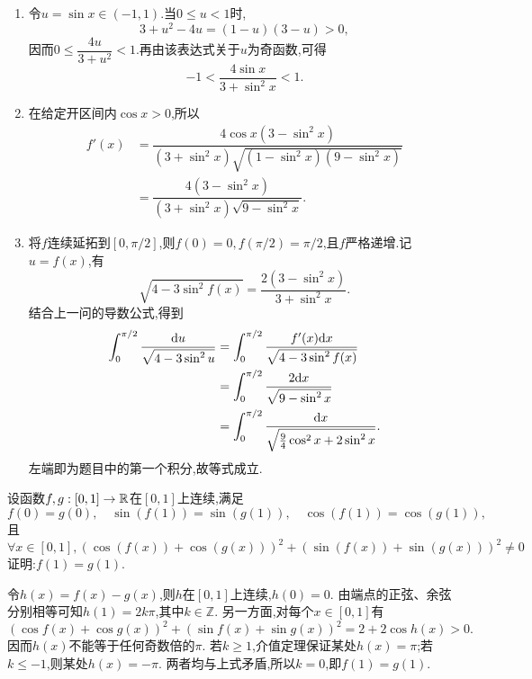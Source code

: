 \documentclass{ctexart}
\begin{document}
\begin{solution}
\begin{enumerate}[label=\textbf{(\arabic*)}]
        \item 令$u=\sin x\in(-1,1)$.当$0\leqslant u<1$时,
            \[3+u^2-4u=(1-u)(3-u)>0,\]
            因而$0\leqslant\dfrac{4u}{3+u^2}<1$.再由该表达式关于$u$为奇函数,可得
            \[-1<\dfrac{4\sin x}{3+\sin^2x}<1.\]
        \item 在给定开区间内$\cos x>0$,所以
            \[\begin{aligned}
            f'(x)&=\dfrac{4\cos x(3-\sin^2x)}{(3+\sin^2x)\sqrt{(1-\sin^2x)(9-\sin^2x)}}\\
            &=\dfrac{4(3-\sin^2x)}{(3+\sin^2x)\sqrt{9-\sin^2x}}.
            \end{aligned}\]
        \item 将$f$连续延拓到$[0,\pi/2]$,则$f(0)=0,f(\pi/2)=\pi/2$,且$f$严格递增.记$u=f(x)$,有
            \[\sqrt{4-3\sin^2f(x)}=\dfrac{2(3-\sin^2x)}{3+\sin^2x}.\]
            结合上一问的导数公式,得到
            \[\begin{aligned}
              \int_0^{\pi/2}\dfrac{\mathrm{d} u}{\sqrt{4-3\sin^2u}}
              &=\int_0^{\pi/2}\dfrac{f'(x)\mathrm{d} x}{\sqrt{4-3\sin^2f(x)}}\\
              &=\int_0^{\pi/2}\dfrac{2\mathrm{d} x}{\sqrt{9-\sin^2x}}\\
              &=\int_0^{\pi/2}\dfrac{\mathrm{d} x}{\sqrt{\frac94\cos^2x+2\sin^2x}}.
            \end{aligned}\]
            左端即为题目中的第一个积分,故等式成立.
    \end{enumerate}
\end{solution}
\begin{problem}[9.(10\songti{分})]
    设函数$f,g:[0,1]\to\mathbb{R}$在$[0,1]$上连续,满足
    \[f(0)=g(0),\quad\sin(f(1))=\sin(g(1)),\quad\cos(f(1))=\cos(g(1)),\]
    且
    $$\forall x\in[0,1],\left(\cos(f(x))+\cos(g(x))\right)^2+\left(\sin(f(x))+\sin(g(x))\right)^2\neq 0$$
    证明:$f(1)=g(1)$.
\end{problem}
\begin{solution}
令$h(x)=f(x)-g(x)$,则$h$在$[0,1]$上连续,$h(0)=0$.
    由端点的正弦、余弦分别相等可知$h(1)=2k\pi$,其中$k\in\mathbb Z$.
    另一方面,对每个$x\in[0,1]$有
    \[(\cos f(x)+\cos g(x))^2+(\sin f(x)+\sin g(x))^2
    =2+2\cos h(x)>0.\]
    因而$h(x)$不能等于任何奇数倍的$\pi$.
    若$k\geqslant1$,介值定理保证某处$h(x)=\pi$;若$k\leqslant-1$,则某处$h(x)=-\pi$.
    两者均与上式矛盾,所以$k=0$,即$f(1)=g(1)$.
\end{solution}
\end{document}
